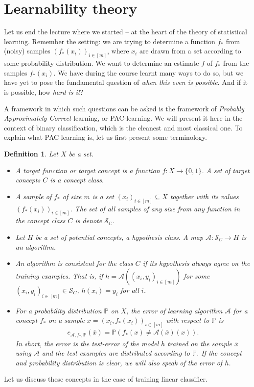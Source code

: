 \documentclass{article}
\newcommand{\calA}{\mathcal{A}}
\newcommand{\calS}{\mathcal{S}}
\newcommand{\sse}{\subseteq}
\newtheorem{defi}{Definition}
\begin{document}
   

\section{Learnability theory}
Let us end the lecture where we started -- at the heart of the theory of statistical learning. Remember the setting: we are trying to determine a function $f_*$ from (noisy) samples $(f_*(x_i))_{i \in [m]}$, where $x_i$ are drawn from a set according to some probability distribution. We want to determine an estimate $f$ of $f_*$ from the samples $f_*(x_i)$. We have during the course learnt many ways to do so, but we have yet to pose the fundamental question of \emph{when this even is possible}. And if it is possible, how \emph{hard is it}? 

A framework in which such questions can be asked is the framework of \emph{Probably Approximately Correct} learning, or PAC-learning.
We will present it here in the context of binary classification, which is the cleanest and most classical one. To explain what PAC learning is, let us first present some terminology.
\begin{defi}
    Let $X$ be a set. 
    \begin{itemize}
        \item A \emph{target function} or \emph{target concept} is a function $f:X \to \{0,1\}$. A set of target concepts $C$ is a \emph{concept class}. 

        \item A \emph{sample of $f_*$} of size $m$ is a set $(x_i)_{i \in [m]}\sse X$ together with its values $(f_*(x_i))_{i \in [m]}$. The set of all samples of any size from any function in the concept class $C$ is denote $\calS_C$.

        \item Let $H$ be a set of potential concepts, a \emph{hypothesis class}. A map $\calA : \calS_C \to H$ is an \emph{algorithm}.

        \item An algorithm is \emph{consistent for the class $C$} if its hypothesis always agree on the training examples. That is, if $h= \calA((x_i,y_i)_{i \in [m]})$ for some $(x_i,y_i)_{i \in [m]} \in \calS_C$,  $h(x_i)=y_i$ for all $i$.

        \item For a probability distribution $\mathbb{P}$ on $X$, the \emph{error of learning algorithm $\calA$ for a concept $f_*$ on a sample $\overline{x} = (x_i,f_*(x_i))_{i \in [m]}$ with respect to $\mathbb{P}$} is
        \begin{align*}
            e_{\calA,f_*,\mathbb{P}}(\overline{x}) = \mathbb{P}(f_*(x)\neq \calA(\overline{x})(x)).
        \end{align*}
        In short, the error is the test-error of the model $h$ trained on the sample $\overline{x}$ using $\calA$ and the test examples are distributed according to $\mathbb{P}$. If the concept and probability distribution is clear, we will also speak of the \emph{error of $h$}. 
    \end{itemize}
\end{defi}
    Let us discuss these concepts in the case of training linear classifier.
\end{document}
